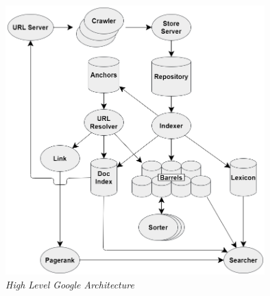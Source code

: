 \begin{figure}[H]
	\centering
	\includegraphics[keepaspectratio, width=10cm]{gambar/google_architecture}
	\caption{\emph{High Level Google Architecture} \citep{brin1998anatomy}}
	\label{gambar:google_architecture}
\end{figure}

